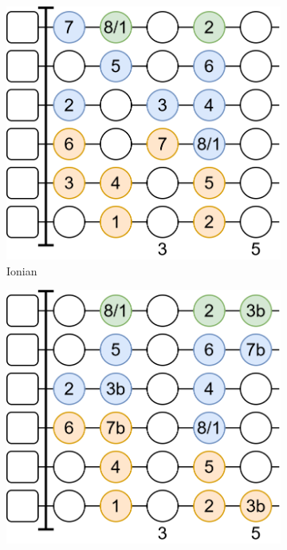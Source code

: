 \begin{figure}[h]
	\begin{subfigure}[b]{0.31\textwidth}
		\centering
		\includegraphics[height=0.175\textheight]{../../Images/IonianScaleShape.png}
		\caption{Ionian}
		\label{fig:guitar_mode_shape_ionian}
	\end{subfigure}
	\hfill
	\begin{subfigure}[b]{0.31\textwidth}
		\centering
		\includegraphics[height=0.175\textheight]{../../Images/DorianScaleShape.png}

\end{subfigure}
\end{figure}
